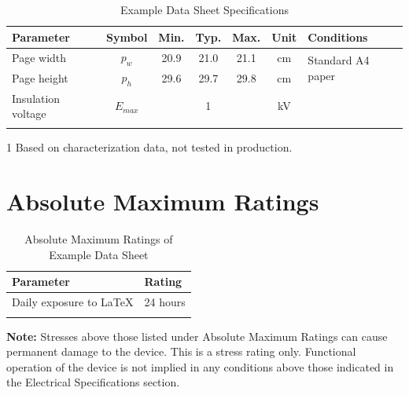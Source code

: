 \documentclass[10pt]{datasheet}
\begin{document}
\begin{table}[h]
\begin{threeparttable}
\caption{Example Data Sheet Specifications}
\begin{tabularx}{\textwidth}{l | c | c c c | c | X}
    \thickhline
    \textbf{Parameter} & \textbf{Symbol} & \textbf{Min.} & \textbf{Typ.} & \textbf{Max.} &
    \textbf{Unit} & \textbf{Conditions} \\
    \hline
    Page width  & $p_w$ & 20.9 & 21.0 & 21.1 & cm & \multirow{2}{*}{Standard A4 paper} \\
    Page height & $p_h$ & 29.6 & 29.7 & 29.8 & cm &  \\
    \hline
    Insulation voltage & $E_{max}$\tnote{1} & & 1 & & kV & \\
    \thickhline
\end{tabularx}
\begin{tablenotes}
\item[1]{Based on characterization data, not tested in production.}
\end{tablenotes}
\end{threeparttable}
\end{table}

\section{Absolute Maximum Ratings}

\begin{table}[h]
\caption{Absolute Maximum Ratings of Example Data Sheet}
\begin{tabularx}{\textwidth}{l | X}
    \thickhline
    \textbf{Parameter} & \textbf{Rating} \hspace{5cm} \\
    \hline
    Daily exposure to LaTeX & 24 hours \\
    \thickhline
\end{tabularx}
\end{table}

\textbf{Note:} Stresses above those listed under Absolute Maximum Ratings can
cause permanent damage to the device. This is a stress rating only. Functional
operation of the device is not implied in any conditions above those indicated
in the Electrical Specifications section.
\end{document}
